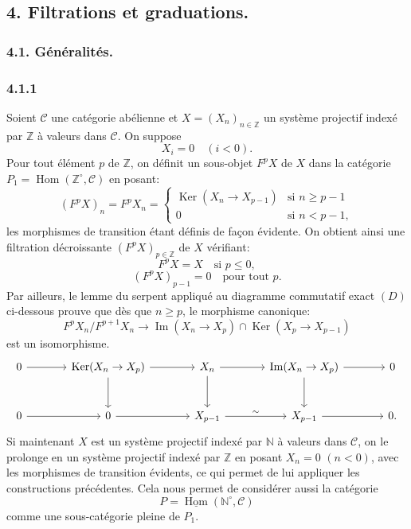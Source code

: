 \documentclass[11pt]{article}
\providecommand{\ZZ}{\mathbb{Z}}
\providecommand{\NN}{\mathbb{N}}
\DeclareMathOperator{\Hom}{Hom}
\providecommand{\Ker}{\operatorname{Ker}}
\providecommand{\uHom}{\underline{\Hom}}
\providecommand{\Hom}{\operatorname{Hom}}
\providecommand{\NN}{\mathbb N}
\providecommand{\cC}{\mathcal C}
\providecommand{\Im}{\operatorname{Im}}
\providecommand{\Ker}{\operatorname{Ker}}
\renewcommand{\Im}{\operatorname{Im}}
\providecommand{\Ker}{\operatorname{Ker}}
\providecommand{\Im}{\operatorname{Im}}
\providecommand{\cC}{\mathcal C}
\providecommand{\Hom}{\operatorname{Hom}}
\begin{document}
\subsection*{4. Filtrations et graduations.}
\subsubsection*{4.1. Généralités.}
\subsubsection*{4.1.1}
Soient $\cC$ une catégorie abélienne et $X=(X_n)_{n\in\ZZ}$ un système projectif indexé par $\ZZ$ à valeurs dans $\cC$. On suppose
\[
X_i=0\quad(i<0).
\]
Pour tout élément $p$ de $\ZZ$, on définit un sous-objet $F^pX$ de $X$ dans la catégorie $P_1=\Hom(\ZZ^\circ,\cC)$ en posant:
\[
(F^pX)_n=F^pX_n=
\begin{cases}
\Ker(X_n\to X_{p-1})& \text{si } n\ge p-1\\
0& \text{si } n<p-1,
\end{cases}
\]
les morphismes de transition étant définis de façon évidente. On obtient ainsi une filtration décroissante $(F^pX)_{p\in\ZZ}$ de $X$ vérifiant:
\begin{equation}\tag{a}
F^pX=X\quad\text{si }p\le0,
\end{equation}
\begin{equation}\tag{b}
(F^pX)_{p-1}=0\quad\text{pour tout }p.
\end{equation}
Par ailleurs, le lemme du serpent appliqué au diagramme commutatif exact $(D)$ ci-dessous prouve que dès que $n\ge p$, le morphisme canonique:
\[
F^pX_n/F^{p+1}X_n\longrightarrow \Im(X_n\to X_p)\cap\Ker(X_p\to X_{p-1})
\]
est un isomorphisme.
\[
\begin{tikzcd}[column sep=large,row sep=large]
0 \arrow[r] & \Ker(X_n\to X_p) \arrow[r] \arrow[d] & X_n \arrow[r] \arrow[d] & \Im(X_n\to X_p) \arrow[r] \arrow[d] & 0\\
0 \arrow[r] & 0 \arrow[r] & X_{p-1} \arrow[r,"\sim"] & X_{p-1} \arrow[r] & 0 .
\end{tikzcd}
\]
Si maintenant $X$ est un système projectif indexé par $\NN$ à valeurs dans $\cC$, on le prolonge en un système projectif indexé par $\ZZ$ en posant $X_n=0$ $(n<0)$, avec les morphismes de transition évidents, ce qui permet de lui appliquer les constructions précédentes.
Cela nous permet de considérer aussi la catégorie
\[
P=\uHom(\NN^\circ,\cC)
\]
comme une sous-catégorie pleine de $P_1$.
\end{document}
